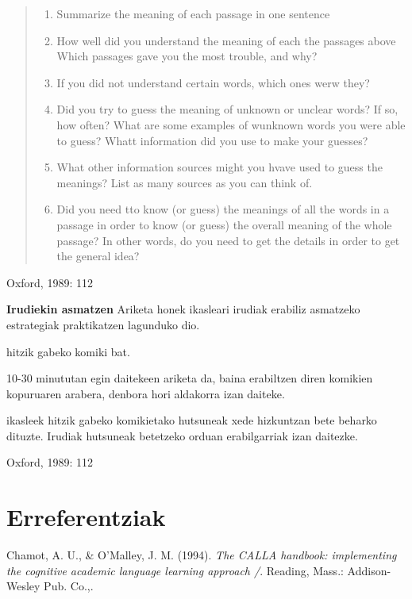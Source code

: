 \documentclass[
]{book}
\providecommand{\tightlist}{%
  \setlength{\itemsep}{0pt}\setlength{\parskip}{0pt}}
\begin{document}
\begin{quote}
\begin{enumerate}
\def\labelenumi{\arabic{enumi}.}
\tightlist
\item
  Summarize the meaning of each passage in one sentence
\item
  How well did you understand the meaning of each the passages above
  Which passages gave you the most trouble, and why?
\item
  If you did not understand certain words, which ones werw they?
\item
  Did you try to guess the meaning of unknown or unclear words?
  If so, how often?
  What are some examples of wunknown words you were able to guess?
  Whatt information did you use to make your guesses?
\item
  What other information sources might you hvave used to guess the meanings?
  List as many sources as you can think of.
\item
  Did you need tto know (or guess) the meanings of all the words in a passage in order to know (or guess) the overall meaning of the whole passage? In other words, do you need to get the details in order to get the general idea?
\end{enumerate}
\end{quote}

Oxford, 1989: 112

\textbf{Irudiekin asmatzen}
Ariketa honek ikasleari irudiak erabiliz asmatzeko estrategiak praktikatzen lagunduko dio.

\begin{description}
\tightlist
\item[Baliabide materiala]
hitzik gabeko komiki bat.
\item[Denbora]
10-30 minututan egin daitekeen ariketa da, baina erabiltzen diren komikien kopuruaren arabera, denbora hori aldakorra izan daiteke.
\item[Nola egin]
ikasleek hitzik gabeko komikietako hutsuneak xede hizkuntzan bete beharko dituzte. Irudiak hutsuneak betetzeko orduan erabilgarriak izan daitezke.
\end{description}

Oxford, 1989: 112

\hypertarget{erreferentziak}{%
\section{Erreferentziak}\label{erreferentziak}}

Chamot, A. U., \& O'Malley, J. M. (1994). \emph{The CALLA handbook: implementing the cognitive academic language learning approach /}. Reading, Mass.: Addison-Wesley Pub. Co.,.
\end{document}
